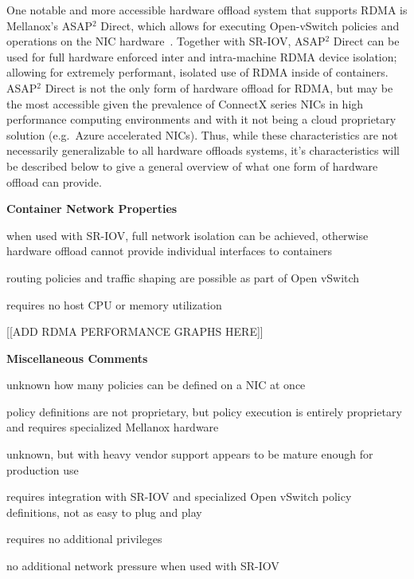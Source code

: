 \documentclass[12pt,titlepage]{article}
\begin{document}
One notable and more accessible hardware offload system that supports RDMA is Mellanox's ASAP$^2$ Direct, which allows for executing Open-vSwitch policies and operations on the NIC hardware~\cite{mellanoxdockerovs}.
Together with SR-IOV, ASAP$^2$ Direct can be used for full hardware enforced inter and intra-machine RDMA device isolation;
allowing for extremely performant, isolated use of RDMA inside of containers.
ASAP$^2$ Direct is not the only form of hardware offload for RDMA, but may be the most accessible given the prevalence of ConnectX series NICs in high performance computing environments and with it not being a cloud proprietary solution (e.g.\ Azure accelerated NICs).
Thus, while these characteristics are not necessarily generalizable to all hardware offloads systems, it's characteristics will be described below to give a general overview of what one form of hardware offload can provide.

\noindent
\textbf{Container Network Properties}
\begin{description}[nolistsep,font={{\scshape\bfseries}}]
	\item[Network Isolation] when used with SR-IOV, full network isolation can be achieved, otherwise hardware offload cannot provide individual interfaces to containers
	\item[Controllability] routing policies and traffic shaping are possible as part of Open vSwitch
	\item[Resource Utilization] requires no host CPU or memory utilization
\end{description}

[[ADD RDMA PERFORMANCE GRAPHS HERE]]

\noindent
\textbf{Miscellaneous Comments}
\begin{description}[nolistsep,font={{\scshape\bfseries}}]
	\item[Scalability Limits] unknown how many policies can be defined on a NIC at once
	\item[Proprietary] policy definitions are not proprietary, but policy execution is entirely proprietary and requires specialized Mellanox hardware
	\item[Maturity] unknown, but with heavy vendor support appears to be mature enough for production use
	\item[Ease in Deployment] requires integration with SR-IOV and specialized Open vSwitch policy definitions, not as easy to plug and play
	\item[Execution Privileges] requires no additional privileges
	\item[Network Pressure] no additional network pressure when used with SR-IOV
\end{description}
\end{document}
